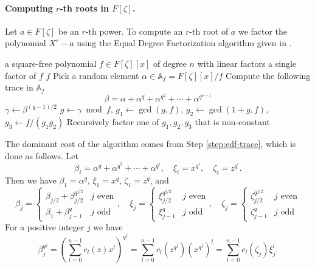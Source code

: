 \documentclass[12pt]{article}
\theoremstyle{plain}
\theoremstyle{definition}
\newcounter{algorithm}
\begin{document}
\paragraph{Computing $r$-th roots in $F[\zeta]$.}
Let $a \in F[\zeta]$ be an $r$-th power. To compute an $r$-th root of $a$ we factor the 
polynomial $X^r - a$ using the Equal Degree Factorization algorithm given in 
\cite{kaltofen+shoup97}.
\begin{algorithm}
	\label{algorithm:edf}
	\begin{algorithmic}[1]
		\REQUIRE a square-free polynomial $f \in F[\zeta][x]$ of degree $n$ with linear factors
		\ENSURE a single factor of $f$
		\RETURN $f$
		\ENDIF
		\STATE Pick a random element $\alpha \in \mathbb{A}_f = F[\zeta][x]/f$
		\STATE\label{step:edf-trace} Compute the following trace in $\mathbb{A}_f$
		\[ \beta = \alpha + \alpha^q + \alpha^{q^2} + \cdots + \alpha^{q^{s - 1}} \]
		\STATE $\gamma \leftarrow \beta^{(q - 1) / 2}$
		\STATE $g \leftarrow \gamma \bmod f$, $g_1 \leftarrow \gcd(g, f)$, $g_2 \leftarrow \gcd(1 + 
		g, f)$, $g_3 \leftarrow f/(g_1g_2)$
		\STATE Recursively factor one of $g_1, g_2, g_3$ that is non-constant
	\end{algorithmic}
\end{algorithm}
The dominant cost of the algorithm comes from Step \ref{step:edf-trace}, which is done as follows. 
Let
\[ \beta_i = \alpha^q + \alpha^{q^2} + \cdots + \alpha^{q^i}, \quad \xi_i = x^{q^i}, \quad \zeta_i 
= z^{q^i}. \]
Then we have $\beta_1 = \alpha^q$, $\xi_1 = x^q$, $\zeta_1 = z^q$, and
\[
\beta_j = 
\begin{cases}
	\beta_{j / 2} + \beta_{j / 2}^{q^{j / 2}} & j \text{ even} \\
	\beta_1 + \beta_{j - 1}^q & j \text{ odd}
\end{cases}, \quad
\xi_j = 
\begin{cases}
	\xi_{j / 2}^{q^{j / 2}} & j \text{ even} \\
	\xi_{j - 1}^q & j \text{ odd}
\end{cases}, \quad
\zeta_j = 
\begin{cases}
	\zeta_{j / 2}^{q^{j / 2}} & j \text{ even} \\
	\zeta_{j - 1}^q & j \text{ odd}
\end{cases}
\]
For a positive integer $j$ we have
\begin{equation}
	\label{equation:betaj}
	\beta_j^{q^j} = \left( \sum_{l = 0}^{n - 1}c_l(z)x^l \right)^{q^j} = \sum_{l = 0}^{n - 
	1}c_l(z^{q^j})(x^{q^j})^l = \sum_{l = 0}^{n - 1}c_l(\zeta_j)\xi_j^l.
\end{equation}
\end{document}
